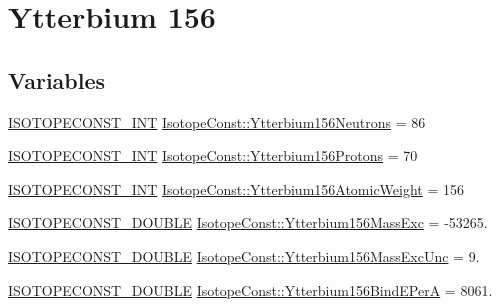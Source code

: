\hypertarget{group___isotope_const-_ytterbium-_yb156}{}\section{Ytterbium 156}
\label{group___isotope_const-_ytterbium-_yb156}
\subsection*{Variables}
\begin{DoxyCompactItemize}
\item 
\mbox{\hyperlink{group___isotope_const-_macros_ga5f18360b3e99483a35c32d789e62621c}{I\+S\+O\+T\+O\+P\+E\+C\+O\+N\+S\+T\+\_\+\+I\+NT}} \mbox{\hyperlink{group___isotope_const-_ytterbium-_yb156_ga75a49ca2da07bfcb8da4c2cb572d5d21}{Isotope\+Const\+::\+Ytterbium156\+Neutrons}} = 86
\item 
\mbox{\hyperlink{group___isotope_const-_macros_ga5f18360b3e99483a35c32d789e62621c}{I\+S\+O\+T\+O\+P\+E\+C\+O\+N\+S\+T\+\_\+\+I\+NT}} \mbox{\hyperlink{group___isotope_const-_ytterbium-_yb156_ga977f078f3a88b51c13a64d4ac9e9a426}{Isotope\+Const\+::\+Ytterbium156\+Protons}} = 70
\item 
\mbox{\hyperlink{group___isotope_const-_macros_ga5f18360b3e99483a35c32d789e62621c}{I\+S\+O\+T\+O\+P\+E\+C\+O\+N\+S\+T\+\_\+\+I\+NT}} \mbox{\hyperlink{group___isotope_const-_ytterbium-_yb156_gae0397d7b4ec1ddc3e157e0a34e49f359}{Isotope\+Const\+::\+Ytterbium156\+Atomic\+Weight}} = 156
\item 
\mbox{\hyperlink{group___isotope_const-_macros_ga8f45a7272ce02c0b4c65c44636ed719a}{I\+S\+O\+T\+O\+P\+E\+C\+O\+N\+S\+T\+\_\+\+D\+O\+U\+B\+LE}} \mbox{\hyperlink{group___isotope_const-_ytterbium-_yb156_ga3dbf7570390d3994ac74730017c6c67b}{Isotope\+Const\+::\+Ytterbium156\+Mass\+Exc}} = -\/53265.
\item 
\mbox{\hyperlink{group___isotope_const-_macros_ga8f45a7272ce02c0b4c65c44636ed719a}{I\+S\+O\+T\+O\+P\+E\+C\+O\+N\+S\+T\+\_\+\+D\+O\+U\+B\+LE}} \mbox{\hyperlink{group___isotope_const-_ytterbium-_yb156_ga1564590433f7a0a8cbb72b38b34f08f4}{Isotope\+Const\+::\+Ytterbium156\+Mass\+Exc\+Unc}} = 9.
\item 
\mbox{\hyperlink{group___isotope_const-_macros_ga8f45a7272ce02c0b4c65c44636ed719a}{I\+S\+O\+T\+O\+P\+E\+C\+O\+N\+S\+T\+\_\+\+D\+O\+U\+B\+LE}} \mbox{\hyperlink{group___isotope_const-_ytterbium-_yb156_ga24c90c15ecb4c74fd2cd6bad4f481050}{Isotope\+Const\+::\+Ytterbium156\+Bind\+E\+PerA}} = 8061.
\item 

\end{DoxyCompactItemize}
